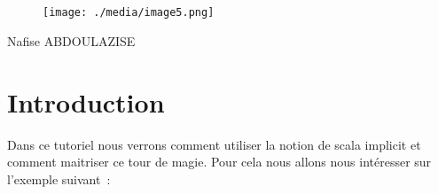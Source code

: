 \documentclass[12pt]{article}
\begin{document}
\begin{figure}[H]	\begin{subfigure}		\texttt{[image: ./media/image3.png]}
	\end{subfigure}
~	\begin{subfigure}		\texttt{[image: ./media/image4.png]}
	\end{subfigure}
~
\end{figure}



\par


\vspace{\baselineskip}



\begin{figure}[H]
	\begin{Center}
		\texttt{[image: ./media/image5.png]}
	\end{Center}
\end{figure}



\par


\vspace{\baselineskip}

\vspace{\baselineskip}

\vspace{\baselineskip}

\vspace{\baselineskip}

\vspace{\baselineskip}

\vspace{\baselineskip}

\vspace{\baselineskip}
{\fontsize{16pt}{19.2pt}\selectfont Nafise ABDOULAZISE\par}\par

\section*{Introduction }

\vspace{\baselineskip}
Dans ce tutoriel nous verrons comment utiliser la notion de scala implicit et comment maitriser ce tour de magie. Pour cela nous allons nous intéresser sur l’exemple suivant :\par
\end{document}
